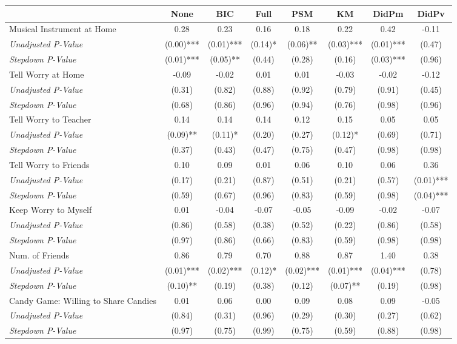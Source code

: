 \begin{tabular}{l c c c c c c c}
\toprule
 & None & BIC & Full & PSM & KM & DidPm & DidPv \\
\midrule
Musical Instrument at Home & 0.28 & 0.23 & 0.16 & 0.18 & 0.22 & 0.42 & -0.11 \\
\quad \textit{Unadjusted P-Value} & (0.00)*** & (0.01)*** & (0.14)* & (0.06)** & (0.03)*** & (0.01)*** & (0.47) \\
\quad \textit{Stepdown P-Value} & (0.01)*** & (0.05)** & (0.44) & (0.28) & (0.16) & (0.03)*** & (0.96) \\
Tell Worry at Home & -0.09 & -0.02 & 0.01 & 0.01 & -0.03 & -0.02 & -0.12 \\
\quad \textit{Unadjusted P-Value} & (0.31) & (0.82) & (0.88) & (0.92) & (0.79) & (0.91) & (0.45) \\
\quad \textit{Stepdown P-Value} & (0.68) & (0.86) & (0.96) & (0.94) & (0.76) & (0.98) & (0.96) \\
Tell Worry to Teacher & 0.14 & 0.14 & 0.14 & 0.12 & 0.15 & 0.05 & 0.05 \\
\quad \textit{Unadjusted P-Value} & (0.09)** & (0.11)* & (0.20) & (0.27) & (0.12)* & (0.69) & (0.71) \\
\quad \textit{Stepdown P-Value} & (0.37) & (0.43) & (0.47) & (0.75) & (0.47) & (0.98) & (0.98) \\
Tell Worry to Friends & 0.10 & 0.09 & 0.01 & 0.06 & 0.10 & 0.06 & 0.36 \\
\quad \textit{Unadjusted P-Value} & (0.17) & (0.21) & (0.87) & (0.51) & (0.21) & (0.57) & (0.01)*** \\
\quad \textit{Stepdown P-Value} & (0.59) & (0.67) & (0.96) & (0.83) & (0.59) & (0.98) & (0.04)*** \\
Keep Worry to Myself & 0.01 & -0.04 & -0.07 & -0.05 & -0.09 & -0.02 & -0.07 \\
\quad \textit{Unadjusted P-Value} & (0.86) & (0.58) & (0.38) & (0.52) & (0.22) & (0.86) & (0.58) \\
\quad \textit{Stepdown P-Value} & (0.97) & (0.86) & (0.66) & (0.83) & (0.59) & (0.98) & (0.98) \\
Num. of Friends & 0.86 & 0.79 & 0.70 & 0.88 & 0.87 & 1.40 & 0.38 \\
\quad \textit{Unadjusted P-Value} & (0.01)*** & (0.02)*** & (0.12)* & (0.02)*** & (0.01)*** & (0.04)*** & (0.78) \\
\quad \textit{Stepdown P-Value} & (0.10)** & (0.19) & (0.38) & (0.12) & (0.07)** & (0.19) & (0.98) \\
Candy Game: Willing to Share Candies & 0.01 & 0.06 & 0.00 & 0.09 & 0.08 & 0.09 & -0.05 \\
\quad \textit{Unadjusted P-Value} & (0.84) & (0.31) & (0.96) & (0.29) & (0.30) & (0.27) & (0.62) \\
\quad \textit{Stepdown P-Value} & (0.97) & (0.75) & (0.99) & (0.75) & (0.59) & (0.88) & (0.98) \\
\bottomrule
\end{tabular}
